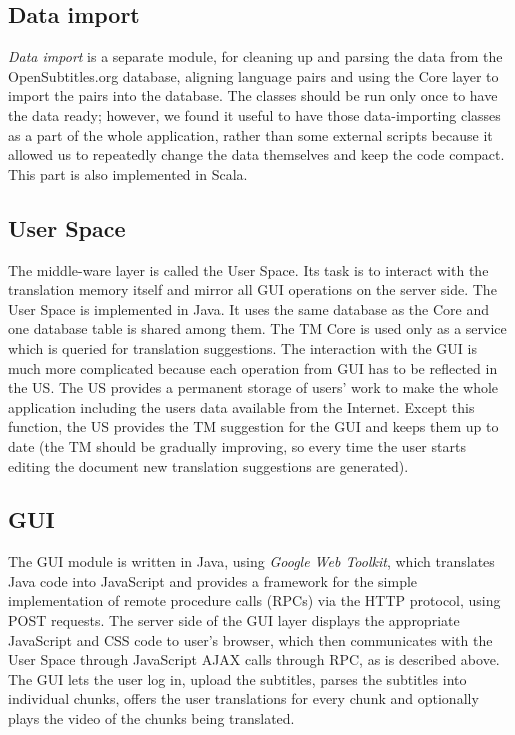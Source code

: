 \subsection*{Data import}

\emph{Data import} is a separate module, for cleaning up and parsing the data from the OpenSubtitles.org database, aligning language pairs and using the Core layer to import the pairs into the database. The classes should be run only once to have the data ready; however, we found it useful to have those data-importing classes as a part of the whole application, rather than some external scripts because it allowed us to repeatedly change the data themselves and keep the code compact. This part is also implemented in Scala.

\subsection*{User Space}

The middle-ware layer is called the User Space. Its task is to interact with the translation memory itself and mirror all GUI operations on the server side. The User Space is implemented in Java. It uses the same database as the Core and one database table is shared among them. The TM Core is used only as a service which is queried for translation suggestions. The interaction with the GUI is much more complicated because each operation from GUI has to be reflected in the US. The US provides a permanent storage of users' work to make the whole application including the users data available from the Internet. Except this function, the US provides the TM suggestion for the GUI and keeps them up to date (the TM should be gradually improving, so every time the user starts editing the document new translation suggestions are generated).

\subsection*{GUI}

The GUI module is written in Java, using \emph{Google Web Toolkit}, which translates Java code into JavaScript and provides a framework for the simple implementation of remote procedure calls (RPCs) via the HTTP protocol, using POST requests. The server side of the GUI layer displays the appropriate JavaScript and CSS code to user's browser, which then communicates with the User Space through JavaScript AJAX calls through RPC, as is described above. The GUI lets the user log in, upload the subtitles, parses the subtitles into individual chunks, offers the user translations for every chunk and optionally plays the video of the chunks being translated.

